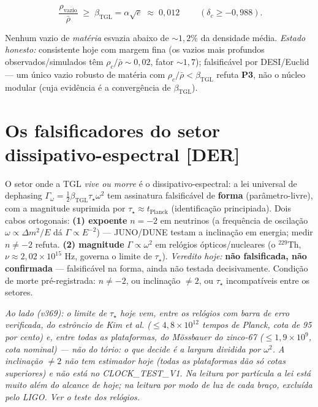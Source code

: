 \documentclass[11pt]{article}
\newcommand{\bTGL}{\beta_{\mathrm{TGL}}}\newcommand{\Msun}{M_{\odot}}\newcommand{\TGL}{\mathrm{TGL}}
\theoremstyle{definition}\newtheorem{deriv}{Derivação}
\begin{document}
\begin{equation}\boxed{\;\frac{\rho_{\mathrm{vazio}}}{\bar\rho}\;\geq\;\bTGL=\alpha\sqrt{e}\;\approx\;0{,}012\;}\qquad(\delta_c\geq-0{,}988).\end{equation}

Nenhum vazio de \emph{matéria} esvazia abaixo de $\sim1{,}2\%$ da densidade média. \emph{Estado honesto:} consistente hoje com margem fina (os vazios mais profundos observados/simulados têm $\rho_c/\bar\rho\sim0{,}02$, fator $\sim1{,}7$); falsificável por DESI/Euclid --- um único vazio robusto de matéria com $\rho_c/\bar\rho<\bTGL$ refuta \textbf{P3}, não o núcleo modular (cuja evidência é a convergência de $\bTGL$).

\section{Os falsificadores do setor dissipativo-espectral \textsf{[DER]}}

O setor onde a TGL \emph{vive ou morre} é o dissipativo-espectral: a lei universal de dephasing $\Gamma_\omega=\tfrac12\bTGL\tau_\star\omega^2$ tem assinatura falsificável de \textbf{forma} (parâmetro-livre), com a magnitude suprimida por $\tau_\star\approx t_{\mathrm{Planck}}$ (identificação principiada). Dois cabos ortogonais: \textbf{(1) expoente} $n=-2$ em neutrinos (a frequência de oscilação $\omega\propto\Delta m^2/E$ dá $\Gamma\propto E^{-2}$) --- JUNO/DUNE testam a inclinação em energia; medir $n\neq-2$ refuta. \textbf{(2) magnitude} $\Gamma\propto\omega^2$ em relógios ópticos/nucleares (o $^{229}$Th, $\nu\approx2{,}02\times10^{15}$ Hz, governa o limite de $\tau_\star$). \emph{Veredito hoje:} \textbf{não falsificada, não confirmada} --- falsificável na forma, ainda não testada decisivamente. Condição de morte pré-registrada: $n\neq-2$, ou inclinação $\neq2$, ou $\tau_\star$ incompatíveis entre os setores.

\emph{Ao lado (v369): o limite de $\tau_\star$ hoje vem, entre os relógios com barra de erro verificada, do estrôncio de Kim et al. ($\le 4{,}8\times10^{12}$ tempos de Planck, cota de 95 por cento) e, entre todas as plataformas, do Mössbauer do zinco-67 ($\le 1{,}9\times10^{9}$, cota nominal) --- não do tório: o que decide é a largura dividida por $\omega^2$. A inclinação $\neq 2$ não tem estimador hoje (todas as plataformas dão só cotas superiores) e não está no CLOCK\_TEST\_V1. Na leitura por partícula a lei está muito além do alcance de hoje; na leitura por modo de luz de cada braço, excluída pelo LIGO. Ver o teste dos relógios.}
\end{document}
